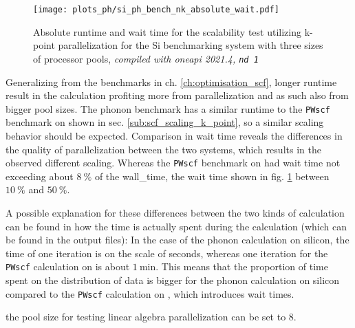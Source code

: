 \documentclass[main.tex]{subfiles}
\begin{document}
\begin{figure}[htb!]
    \centering
    \texttt{[image: plots\_ph/si\_ph\_bench\_nk\_absolute\_wait.pdf]}
    \caption{Absolute runtime and wait time for the scalability test utilizing k-point parallelization for the Si benchmarking system with three sizes of processor pools, \emph{\QE compiled with \gls{oneapi} 2021.4, \texttt{nd 1}}}
    \label{fig:scaling_ph_nk_si_absolute_wait}
\end{figure}
Generalizing from the benchmarks in ch. \ref{ch:optimisation_scf}, longer runtime result in the calculation profiting more from parallelization and as such also from bigger pool sizes.
The phonon benchmark has a similar runtime to the \texttt{PWscf} benchmark on \TaS shown in sec. \ref{sub:scf_scaling_k_point}, so a similar scaling behavior should be expected.
Comparison in wait time reveals the differences in the quality of parallelization between the two systems, which results in the observed different scaling. 
Whereas the \texttt{PWscf} benchmark on \TaS had wait time not exceeding about \(\SI{8}{\percent}\) of the \gls{wall_time}, the wait time shown in fig. \ref{fig:scaling_ph_nk_si_absolute_wait} between \(\SI{10}{\percent}\) and \(\SI{50}{\percent}\).

A possible explanation for these differences between the two kinds of calculation can be found in how the time is actually spent during the calculation (which can be found in the \QE output files):
In the case of the phonon calculation on silicon, the time of one iteration is on the scale of seconds, whereas one iteration for the \texttt{PWscf} calculation on \TaS is about \(\SI{1}{\minute}\).
This means that the proportion of time spent on the distribution of data is bigger for the phonon calculation on silicon compared to the \texttt{PWscf} calculation on \TaS, which introduces wait times.

 the pool size for testing linear algebra parallelization can be set to 8.
\end{document}
